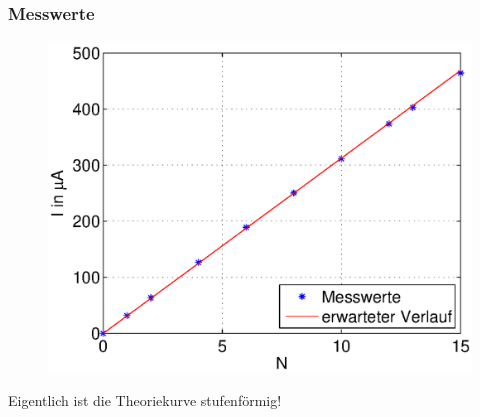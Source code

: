 \begin{frame}
    \frametitle{Messwerte}
    \framesubtitle{}
    \begin{figure}[H]
    \begin{center}
            \includegraphics[scale=0.37]{./img/graph/Aufgabe1a.eps}
    \end{center}
    \end{figure}
    \begin{alertblock}{}
        \begin{center}
            Eigentlich ist die Theoriekurve stufenförmig!
        \end{center}
    \end{alertblock}
\end{frame}


